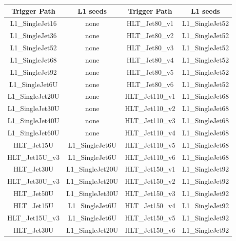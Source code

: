 \begin{table}[th]
  \centering
  \normalsize
  \begin{tabular}{|c|c||c|c|}
    \hline
    Trigger Path     & L1 seeds          & Trigger Path    & L1 seeds        \\
    \hline 
    \hline
    L1\_SingleJet16  &  none             & HLT\_Jet80\_v1  & L1\_SingleJet52 \\
    \hline
    L1\_SingleJet36  &  none             & HLT\_Jet80\_v2  & L1\_SingleJet52 \\
    \hline
    L1\_SingleJet52  &  none             & HLT\_Jet80\_v3  & L1\_SingleJet52 \\
    \hline
    L1\_SingleJet68  &  none             & HLT\_Jet80\_v4  & L1\_SingleJet52 \\
    \hline
    L1\_SingleJet92  &  none             & HLT\_Jet80\_v5  & L1\_SingleJet52 \\
    \hline
    L1\_SingleJet6U  &  none             & HLT\_Jet80\_v6  & L1\_SingleJet52 \\
    \hline
    L1\_SingleJet20U &  none             & HLT\_Jet110\_v1  & L1\_SingleJet68 \\
    \hline
    L1\_SingleJet30U &  none             & HLT\_Jet110\_v2  & L1\_SingleJet68 \\
    \hline
    L1\_SingleJet40U &  none             & HLT\_Jet110\_v3  & L1\_SingleJet68 \\
    \hline
    L1\_SingleJet60U &  none             & HLT\_Jet110\_v4 & L1\_SingleJet68 \\
    \hline
    HLT\_Jet15U      &  L1\_SingleJet6U  & HLT\_Jet110\_v5 & L1\_SingleJet68 \\
    \hline
    HLT\_Jet15U\_v3  &  L1\_SingleJet6U  & HLT\_Jet110\_v6 & L1\_SingleJet68 \\
    \hline
    HLT\_Jet30U      &  L1\_SingleJet20U & HLT\_Jet150\_v1 & L1\_SingleJet92 \\
    \hline
    HLT\_Jet30U\_v3  &  L1\_SingleJet20U & HLT\_Jet150\_v2 & L1\_SingleJet92 \\
    \hline
    HLT\_Jet50U      &  L1\_SingleJet30U & HLT\_Jet150\_v3 & L1\_SingleJet92 \\
    \hline
    HLT\_Jet15U      &  L1\_SingleJet6U  & HLT\_Jet150\_v4 & L1\_SingleJet92 \\
    \hline
    HLT\_Jet15U\_v3  &  L1\_SingleJet6U  & HLT\_Jet150\_v5 & L1\_SingleJet92 \\
    \hline
    HLT\_Jet30U      &  L1\_SingleJet20U & HLT\_Jet150\_v6 & L1\_SingleJet92 \\

\end{tabular}
\end{table}
